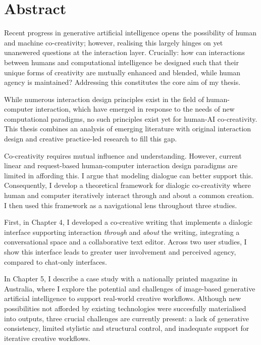 \chapter{Abstract}

Recent progress in generative artificial intelligence opens the possibility of human and machine co-creativity; however, realising this largely hinges on yet unanswered questions at the interaction layer. Crucially: how can interactions between humans and computational intelligence be designed such that their unique forms of creativity are mutually enhanced and blended, while human agency is maintained? Addressing this constitutes the core aim of my thesis.

While numerous interaction design principles exist in the field of human-computer interaction, which have emerged in response to the needs of new computational paradigms, no such principles exist yet for human-AI co-creativity. This thesis combines an analysis of emerging literature with original interaction design and creative practice-led research to fill this gap. 

Co-creativity requires mutual influence and understanding. However, current linear and request-based human-computer interaction design paradigms are limited in affording this. I argue that modeling dialogue can better support this. Consequently, I develop a theoretical framework for dialogic co-creativity where human and computer iteratively interact through and about a common creation.  I then used this framework as a navigational lens throughout three studies. 

First, in Chapter 4, I developed a co-creative writing that implements a dialogic interface supporting interaction \textit{through} and \textit{about} the writing, integrating a conversational space and a collaborative text editor. Across two user studies, I show this interface leads to greater user involvement and perceived agency, compared to chat-only interfaces. 

In Chapter 5, I describe a case study with a nationally printed magazine in Australia, where I explore the potential and challenges of image-based generative artificial intelligence to support real-world creative workflows. Although new possibilities not afforded by existing technologies were succesfully materialised into outputs, three crucial challenges are currently present: a lack of generative consistency, limited stylistic and structural control, and inadequate support for iterative creative workflows. 

